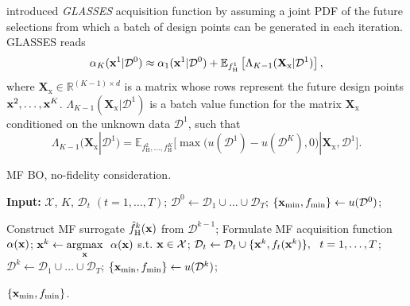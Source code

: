 \documentclass[journal ]{new-aiaa}
\begin{document}
	\citet{Gonzalez2016} introduced \textit{GLASSES} acquisition function by assuming a joint PDF of the future selections from which a batch of design points can be generated in each iteration.
	GLASSES reads
	\begin{equation}\label{eqn54}
		\alpha_K({\bf x}^1|\mathcal{D}^0) \approx \alpha_1({\bf x}^1|\mathcal{D}^0) + \mathbb{E}_{f^1_\text{H}}\left[\Lambda_{K-1}(\textbf{X}_\text{x}|\mathcal{D}^1)\right],
	\end{equation}
	where 
	$\textbf{X}_\text{x} \in \mathbb{R}^{(K-1) \times d}$ is a matrix whose rows represent the future design points ${\bf x}^2,\dots,{\bf x}^K$. $\Lambda_{K-1}(\textbf{X}_\text{x}|\mathcal{D}^1)$ is a batch value function for the matrix  $\textbf{X}_\text{x}$ conditioned on the unknown data $\mathcal{D}^1$, such that 
	\begin{equation}\label{eqn55}
		\Lambda_{K-1}(\textbf{X}_\text{x}|\mathcal{D}^1)
		=\mathbb{E}_{f_\text{H}^2,\dots,f_\text{H}^K}\Bigg[\max\Big(u(\mathcal{D}^1)-u(\mathcal{D}^K),0  \Big)|\textbf{X}_\text{x},\mathcal{D}^1\Bigg].
	\end{equation}
	
	\begin{algorithm}
		\caption{MF BO, no-fidelity consideration.}\label{Algo3}
		\begin{algorithmic}[1]
			\State \textbf{Input:} $\mathcal{X}$, $K$, $\mathcal{D}_t$ $(t=1,\dots,T)$;
			\State $\mathcal{D}^0 \gets \mathcal{D}_1 \cup \dots \cup \mathcal{D}_T$;
			\State $\{{\bf x}_{\min},f_{\min}\} \gets u(\mathcal{D}^0)$; \label{Algo3:3}
			
			\State Construct MF surrogate $\hat{f}_\text{H}^k({\bf x})$ from $\mathcal{D}^{k-1}$;
			\State Formulate MF acquisition function $\alpha({\bf x})$; \label{Algo3:6}
			\State ${\bf x}^{k} \gets \underset{{\bf x}}{\mathrm{argmax}} \ \ \alpha({\bf x})$ s.t. ${\bf x} \in \mathcal{X}$;
			\State $\mathcal{D}_t \gets \mathcal{D}_t \cup \{{\bf x}^{k},f_t({\bf x}^{k})\}, \ \ t=1,\dots,T$;
			\State $\mathcal{D}^k \gets \mathcal{D}_1 \cup \dots \cup \mathcal{D}_T$;
			\State $\{{\bf x}_{\min},f_{\min}\} \gets u(\mathcal{D}^k)$; \label{Algo3:10}
			\EndFor
			
			\State \Return $\{{\bf x}_{\min},f_{\min}\}$.
		\end{algorithmic}
	\end{algorithm}
	
\end{document}
